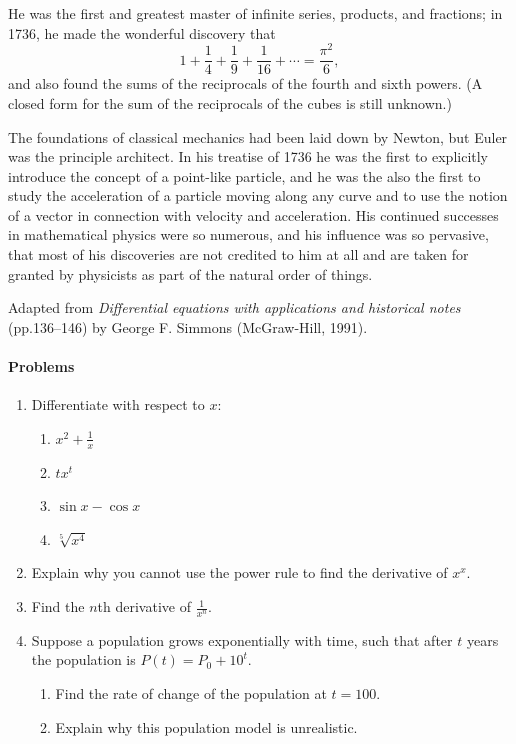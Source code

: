 He was the first and greatest master of infinite series, products, and fractions; in 1736, he made the wonderful discovery that
\begin{displaymath}
  1 + \frac{1}{4} + \frac{1}{9} + \frac{1}{16} + \cdots = \frac{\pi^2}{6},
\end{displaymath}
and also found the sums of the reciprocals of the fourth and sixth powers. (A closed form for the sum of the reciprocals of the
cubes is still unknown.)

The foundations of classical mechanics had been laid down by Newton, but Euler was the principle architect. In his treatise of 1736
he was the first to explicitly introduce the concept of a point-like particle, and he was the also the first to study the acceleration
of a particle moving along any curve and to use the notion of a vector in connection with velocity and acceleration. His continued
successes in mathematical physics were so numerous, and his influence was so pervasive, that most of his discoveries are not credited
to him at all and are taken for granted by physicists as part of the natural order of things.

\begin{flushright}
  Adapted from \textit{Differential equations with applications and historical notes} (pp.136--146) by George F. Simmons (McGraw-Hill, 1991).
\end{flushright}


\paragraph{Problems}
\begin{enumerate}
  \item Differentiate with respect to $ x $:
    \begin{enumerate}
      \item $ x^2 + \frac{1}{x} $
      \item $ tx^t $
      \item $ \sin x - \cos x $
      \item $ \sqrt[5]{x^4} $
    \end{enumerate}
  \item Explain why you cannot use the power rule to find the derivative of $ x^x $.
  \item Find the $ n$th derivative of $ \frac{1}{x^n} $.
  \item Suppose a population grows exponentially with time, such that after $ t $ years the population is $ P(t) = P_0 + 10^t $.
    \begin{enumerate}
      \item Find the rate of change of the population at $ t = 100 $.
      \item Explain why this population model is unrealistic.
    \end{enumerate}
\end{enumerate}

